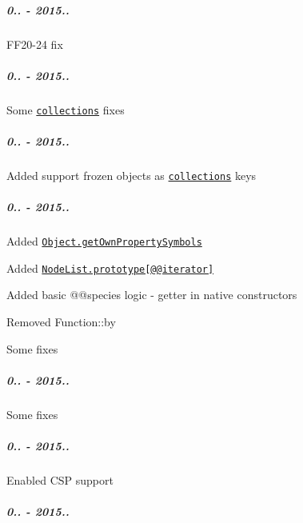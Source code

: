 \subparagraph*{0.. -\/ 2015..}


\begin{DoxyItemize}
\item F\+F20-\/24 fix
\end{DoxyItemize}

\subparagraph*{0.. -\/ 2015..}


\begin{DoxyItemize}
\item Some \href{https://github.com/zloirock/core-js/#ecmascript-6-collections}{\tt collections} fixes
\end{DoxyItemize}

\subparagraph*{0.. -\/ 2015..}


\begin{DoxyItemize}
\item Added support frozen objects as \href{https://github.com/zloirock/core-js/#ecmascript-6-collections}{\tt collections} keys
\end{DoxyItemize}

\subparagraph*{0.. -\/ 2015..}


\begin{DoxyItemize}
\item Added \href{https://github.com/zloirock/core-js/#ecmascript-6-symbol}{\tt {\ttfamily Object.\+get\+Own\+Property\+Symbols}}
\item Added \href{https://github.com/zloirock/core-js/#ecmascript-6-iterators}{\tt {\ttfamily Node\+List.\+prototype\mbox{[}@@iterator\mbox{]}}}
\item Added basic {\ttfamily @@species} logic -\/ getter in native constructors
\item Removed {\ttfamily Function\+::by}
\item Some fixes
\end{DoxyItemize}

\subparagraph*{0.. -\/ 2015..}


\begin{DoxyItemize}
\item Some fixes
\end{DoxyItemize}

\subparagraph*{0.. -\/ 2015..}


\begin{DoxyItemize}
\item Enabled C\+SP support
\end{DoxyItemize}

\subparagraph*{0.. -\/ 2015..}


